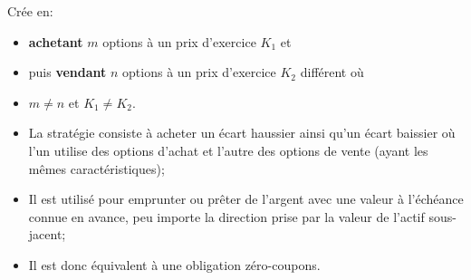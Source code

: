\documentclass[10pt, french]{article}
\begin{document}
\begin{multicols*}{2}
\begin{definitionNOHFILL}
\begin{center}
\begin{tikzpicture}[x=0.75pt,y=0.75pt,yscale=-1,xscale=1]
\end{tikzpicture}
\end{center}
	
\end{definitionNOHFILL}

\begin{definitionNOHFILL}
Crée en:
\begin{itemize}[leftmargin = *]
	\item	\textbf{achetant} $m$ options à un prix d'exercice $K_{1}$ et
	\item	puis \textbf{vendant} $n$ options à un prix d'exercice $K_{2}$ différent où
	\item	$m \neq n$ et $K_{1} \neq K_{2}$.
\end{itemize}

\end{definitionNOHFILL}

\begin{definitionNOHFILL}
\begin{itemize}[leftmargin = *]
	\item	La stratégie consiste à acheter un écart haussier ainsi qu'un écart baissier où l'un utilise des options d'achat et l'autre des options de vente (ayant les mêmes caractéristiques);
	\item	Il est utilisé pour emprunter ou prêter de l'argent avec une valeur à l'échéance connue en avance, peu importe la direction prise par la valeur de l'actif sous-jacent;
	\item	Il est donc équivalent à une obligation zéro-coupons.
\end{itemize}

\begin{center}
\begin{tikzpicture}[x=0.75pt,y=0.75pt,yscale=-1,xscale=1]


\end{tikzpicture}
\end{center}
\end{definitionNOHFILL}
\end{multicols*}
\end{document}
